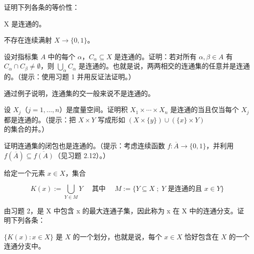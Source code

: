 \begin{exercises}
\item

证明下列各条的等价性：

\begin{items}
\item

X 是连通的。

\item

不存在连续满射 $ X \to \{0,1\} $。

\end{items}

\item

设对指标集 $ A $ 中的每个 $ \alpha $，$ C_\alpha \subseteq X $ 是连通的。证明：若对所有 $ \alpha, \beta \in A $ 有 $ C_\alpha \cap C_\beta \neq \emptyset $，则 $ \bigcup_\alpha C_\alpha $ 是连通的。也就是说，两两相交的连通集的任意并是连通的。（提示：使用习题 1 并用反证法证明。）

\item

通过例子说明，连通集的交一般来说不是连通的。

\item

设 $ X_j $（$ j = 1, \ldots, n $）是度量空间。证明积 $ X_1 \times \cdots \times X_n $ 是连通的当且仅当每个 $ X_j $ 都是连通的。（提示：把 $ X \times Y $ 写成形如 $ (X \times \{y\}) \cup (\{x\} \times Y) $ 的集合的并。）

\item

证明连通集的闭包也是连通的。（提示：考虑连续函数 $ f: \overline{A} \to \{0,1\} $，并利用 $ f(\overline{A}) \subseteq \overline{f(A)} $（见习题 2.12）。）

\item

给定一个元素 $ x \in X $，集合

\[
K(x):=\bigcup_{Y\in M}Y\quad\text{ 其中 }\quad M:=\{Y\subseteq X\;;\;Y\text{ 是连通的且 }x\in Y\}
\]

由习题 2，是 X 中包含 x 的最大连通子集，因此称为 x 在 X 中的连通分支。证明下列各条：

\begin{items}
\item

$ \{K(x) : x \in X\} $ 是 $ X $ 的一个划分，也就是说，每个 $ x \in X $ 恰好包含在 $ X $ 的一个连通分支中。

\item


\end{items}
\end{exercises}

